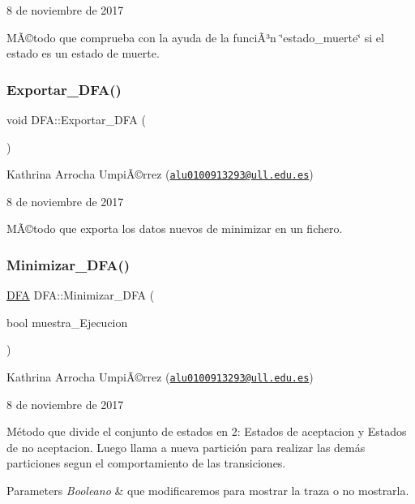 8 de noviembre de 2017

MÃ©todo que comprueba con la ayuda de la funciÃ³n \char`\"{}estado\+\_\+muerte\char`\"{} si el estado es un estado de muerte. \mbox{\label{class_d_f_a_abcfd9884cece764167a8c3c8fa083497}} 
\subsubsection{\texorpdfstring{Exportar\+\_\+\+D\+F\+A()}{Exportar\_DFA()}}
{\footnotesize\ttfamily void D\+F\+A\+::\+Exportar\+\_\+\+D\+FA (\begin{DoxyParamCaption}{ }\end{DoxyParamCaption})}

Kathrina Arrocha UmpiÃ©rrez (\href{mailto:alu0100913293@ull.edu.es}{\tt alu0100913293@ull.\+edu.\+es})

8 de noviembre de 2017

MÃ©todo que exporta los datos nuevos de minimizar en un fichero. \mbox{\label{class_d_f_a_a9dc081c267475f9d5099dfff03ced6a2}} 
\subsubsection{\texorpdfstring{Minimizar\+\_\+\+D\+F\+A()}{Minimizar\_DFA()}}
{\footnotesize\ttfamily \hyperlink{class_d_f_a}{D\+FA} D\+F\+A\+::\+Minimizar\+\_\+\+D\+FA (\begin{DoxyParamCaption}\item[{bool}]{muestra\+\_\+\+Ejecucion }\end{DoxyParamCaption})}

Kathrina Arrocha UmpiÃ©rrez (\href{mailto:alu0100913293@ull.edu.es}{\tt alu0100913293@ull.\+edu.\+es})

8 de noviembre de 2017

Método que divide el conjunto de estados en 2\+: Estados de aceptacion y Estados de no aceptacion. Luego llama a nueva partición para realizar las demás particiones segun el comportamiento de las transiciones.


\begin{DoxyParams}{Parameters}
{\em Booleano} & que modificaremos para mostrar la traza o no mostrarla. \\
\hline
\end{DoxyParams}
\mbox{\label{class_d_f_a_a169da2171e0e1182cd1da0948df45172}} 
